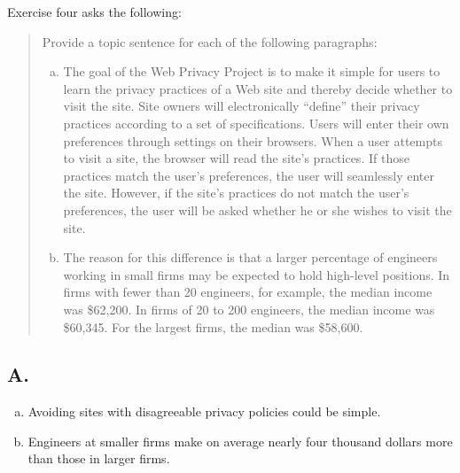 \documentclass{memoir}
\begin{document}
Exercise four asks the following:

\begin{quote}
	Provide a topic sentence for each of the following paragraphs:

	\begin{enumerate}[a.]
		\item{
			The goal of the Web Privacy Project is to make it simple for users to learn the privacy practices of a Web site and thereby decide whether to visit the site. Site owners will electronically “define” their privacy practices according to a set of specifications. Users will enter their own preferences through settings on their browsers. When a user attempts to visit a site, the browser will read the site’s practices. If those practices match the user’s preferences, the user will seamlessly enter the site. However, if the site’s practices do not match the user’s preferences, the user will be asked whether he or she wishes to visit the site.
		}
		\item{
			The reason for this difference is that a larger percentage of engineers working in small firms may be expected to hold high-level positions. In firms with fewer than 20 engineers, for example, the median income was \$62,200. In firms of 20 to 200 engineers, the median income was \$60,345. For the largest firms, the median was \$58,600.
		}
	\end{enumerate}
\end{quote}

\subsection{A.}

\begin{enumerate}[a.]
	\item{
		Avoiding sites with disagreeable privacy policies could be simple.
	}
	\item{
		Engineers at smaller firms make on average nearly four thousand dollars more than those in larger firms.
	}
\end{enumerate}
\end{document}
